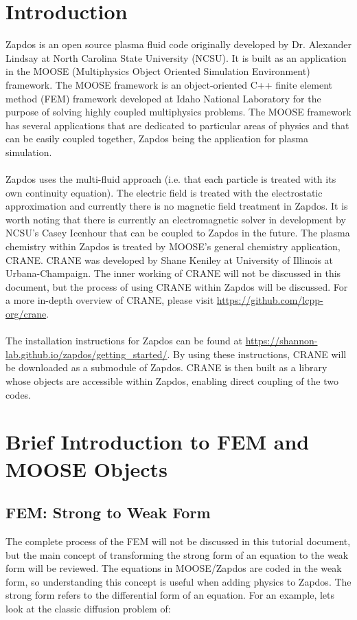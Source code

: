 \documentclass[final]{report}
\begin{document}
  \tableofcontents

  \chapter{Introduction} \label{introduction}
  Zapdos is an open source plasma fluid code originally developed by Dr. Alexander Lindsay at North Carolina State University (NCSU). It is built as an application in the MOOSE (Multiphysics Object Oriented Simulation Environment) framework. The MOOSE framework is an object-oriented C++ finite element method (FEM) framework developed at Idaho National Laboratory for the purpose of solving highly coupled multiphysics problems. The MOOSE framework has several applications that are dedicated to particular areas of physics and that can be easily coupled together, Zapdos being the application for plasma simulation. \\
  \\
  Zapdos uses the multi-fluid approach (i.e. that each particle is treated with its own continuity equation). The electric field is treated with the electrostatic approximation and currently there is no magnetic field treatment in Zapdos. It is worth noting that there is currently an electromagnetic solver in development by NCSU's Casey Icenhour that can be coupled to Zapdos in the future. The plasma chemistry within Zapdos is treated by MOOSE's general chemistry application, CRANE. CRANE was developed by Shane Keniley at University of Illinois at Urbana-Champaign. The inner working of CRANE will not be discussed in this document, but the process of using CRANE within Zapdos will be discussed. For a more in-depth overview of CRANE, please visit \url{https://github.com/lcpp-org/crane}.\\
  \\
  The installation instructions for Zapdos can be found at \url{https://shannon-lab.github.io/zapdos/getting_started/}. By using these instructions, CRANE will be downloaded as a submodule of Zapdos. CRANE is then built as a library whose objects are accessible within Zapdos, enabling direct coupling of the two codes.

  \chapter{Brief Introduction to FEM and MOOSE Objects} \label{chapter2}
  \section{FEM: Strong to Weak Form}
  The complete process of the FEM will not be discussed in this tutorial document, but the main concept of transforming the strong form of an equation to the weak form will be reviewed. The equations in MOOSE/Zapdos are coded in the weak form, so understanding this concept is useful when adding physics to Zapdos. The strong form refers to the differential form of an equation. For an example, lets look at the classic diffusion problem of:
\end{document}

